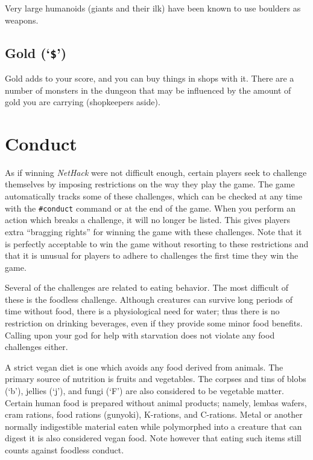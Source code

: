 Very large humanoids (giants and their ilk) have been known to use boulders
as weapons.

\subsection*{Gold (`{\tt \$}')}

Gold adds to your score, and you can buy things in shops with it.
There are a number
of monsters in the dungeon that may be influenced by the amount of gold
you are carrying (shopkeepers aside).

\section{Conduct}

As if winning {\it NetHack\/} were not difficult enough, certain players
seek to challenge themselves by imposing restrictions on the
way they play the game.  The game automatically tracks some of
these challenges, which can be checked at any time with the {\tt \#conduct}
command or at the end of the game.  When you perform an action which
breaks a challenge, it will no longer be listed.  This gives
players extra ``bragging rights'' for winning the game with these
challenges.  Note that it is perfectly acceptable to win the game
without resorting to these restrictions and that it is unusual for
players to adhere to challenges the first time they win the game.

Several of the challenges are related to eating behavior.  The most
difficult of these is the foodless challenge.  Although creatures
can survive long periods of time without food, there is a physiological
need for water; thus there is no restriction on drinking beverages,
even if they provide some minor food benefits.
Calling upon your god for help with starvation does
not violate any food challenges either.

A strict vegan diet is one which avoids any food derived from animals.
The primary source of nutrition is fruits and vegetables.  The
corpses and tins of blobs (`b'), jellies (`j'), and fungi (`F') are
also considered to be vegetable matter.  Certain human
food is prepared without animal products; namely, lembas wafers, cram
rations, food rations (gunyoki), K-rations, and C-rations.
Metal or another normally indigestible material eaten while polymorphed
into a creature that can digest it is also considered vegan food.
Note however that eating such items still counts against foodless conduct.

